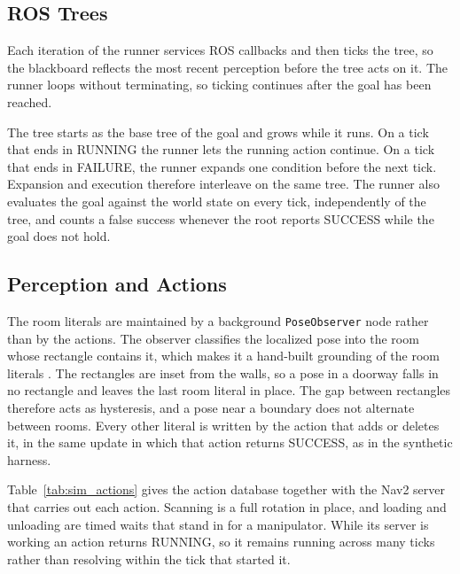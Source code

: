     \subsection{ROS Trees}
    \label{subsec:sim_ros_trees}
    Each iteration of the runner services ROS callbacks and then ticks the tree, so the blackboard reflects the most recent perception before the tree acts on it.
    The runner loops without terminating, so ticking continues after the goal has been reached.

    The tree starts as the base tree of the goal and grows while it runs.
    On a tick that ends in RUNNING the runner lets the running action continue.
    On a tick that ends in FAILURE, the runner expands one condition before the next tick.
    Expansion and execution therefore interleave on the same tree.
    The runner also evaluates the goal against the world state on every tick, independently of the tree, and counts a false success whenever the root reports SUCCESS while the goal does not hold.

    \subsection{Perception and Actions}
    \label{subsec:sim_perception_literals}
    \label{subsec:sim_nav2_actions}
    The room literals are maintained by a background \texttt{PoseObserver} node rather than by the actions.
    The observer classifies the localized pose into the room whose rectangle contains it, which makes it a hand-built grounding of the room literals \cite{konidaris2018}.
    The rectangles are inset from the walls, so a pose in a doorway falls in no rectangle and leaves the last room literal in place.
    The gap between rectangles therefore acts as hysteresis, and a pose near a boundary does not alternate between rooms.
    Every other literal is written by the action that adds or deletes it, in the same update in which that action returns SUCCESS, as in the synthetic harness.

    Table~\ref{tab:sim_actions} gives the action database together with the Nav2 server that carries out each action.
    Scanning is a full rotation in place, and loading and unloading are timed waits that stand in for a manipulator.
    While its server is working an action returns RUNNING, so it remains running across many ticks rather than resolving within the tick that started it.

